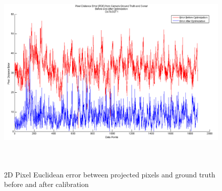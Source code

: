 \documentclass[15pt]{article}
\begin{document}
\begin{figure}[!htbp]
  \includegraphics[width=\textwidth,height=10cm]{5}
  \caption{2D Pixel Euclidean error between projected pixels and ground truth before and after calibration}
\end{figure}
\end{document}
